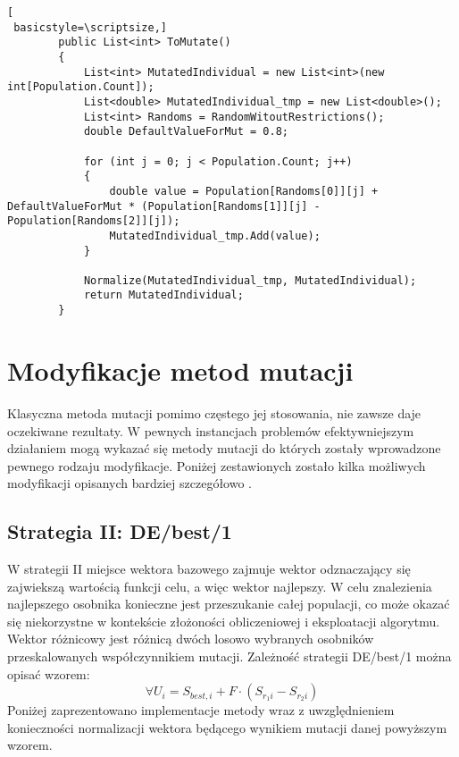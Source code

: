 \begin{program}[h!]
\begin{lstlisting}[
 basicstyle=\scriptsize,]
        public List<int> ToMutate()
        {
            List<int> MutatedIndividual = new List<int>(new int[Population.Count]);
            List<double> MutatedIndividual_tmp = new List<double>();
            List<int> Randoms = RandomWitoutRestrictions();
            double DefaultValueForMut = 0.8;

            for (int j = 0; j < Population.Count; j++)
            {
                double value = Population[Randoms[0]][j] + DefaultValueForMut * (Population[Randoms[1]][j] - Population[Randoms[2]][j]);
                MutatedIndividual_tmp.Add(value);
            }

            Normalize(MutatedIndividual_tmp, MutatedIndividual);
            return MutatedIndividual;
        }
\end{lstlisting}
\end{program}

\section{Modyfikacje metod mutacji}\label{sec:kompilacja}

Klasyczna metoda mutacji pomimo częstego jej stosowania, nie zawsze daje oczekiwane rezultaty.  W pewnych instancjach problemów efektywniejszym działaniem mogą wykazać się metody mutacji do których zostały wprowadzone pewnego rodzaju modyfikacje. Poniżej zestawionych zostało kilka możliwych modyfikacji opisanych bardziej szczegółowo \cite{diff2}.

\subsection{Strategia II: DE/best/1}\label{sec:kompilacja}

W strategii II miejsce wektora bazowego zajmuje wektor odznaczający się zajwiekszą wartością funkcji celu, a więc wektor najlepszy. W celu znalezienia najlepszego osobnika konieczne jest przeszukanie całej populacji, co może okazać się niekorzystne w kontekście złożoności obliczeniowej i eksploatacji algorytmu. Wektor różnicowy jest różnicą dwóch losowo wybranych osobników przeskalowanych współczynnikiem mutacji. Zależność strategii DE/best/1 można opisać wzorem:
$$
 \forall U_{i} =S_{best,i} + F \cdot (S_{r_{1}i} - S_{r_{2}i})
$$
Poniżej zaprezentowano implementacje metody wraz z uwzględnieniem konieczności normalizacji wektora będącego wynikiem mutacji danej powyższym wzorem. 


